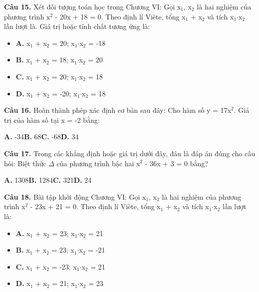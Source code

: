 \documentclass[11pt,a4paper]{article}
\begin{document}
\textbf{\color{primary} Câu 15.} Xét đối tượng toán học trong Chương VI: Gọi x$_1$, x$_2$ là hai nghiệm của phương trình x$^2$ - 20x + 18 = 0. Theo định lí Viète, tổng x$_1$ + x$_2$ và tích x$_1$$\cdot$x$_2$ lần lượt là. Giá trị hoặc tính chất tương ứng là:\par
\begin{itemize}\setlength{\itemsep}{1pt}\setlength{\parskip}{0pt}
  \item[] \textbf{A.} x$_1$ + x$_2$ = 20; x$_1$$\cdot$x$_2$ = -18
  \item[] \textbf{B.} x$_1$ + x$_2$ = 18; x$_1$$\cdot$x$_2$ = 20
  \item[] \textbf{C.} x$_1$ + x$_2$ = 20; x$_1$$\cdot$x$_2$ = 18
  \item[] \textbf{D.} x$_1$ + x$_2$ = -20; x$_1$$\cdot$x$_2$ = 18
\end{itemize}\vspace{2pt}
\textbf{\color{primary} Câu 16.} Hoàn thành phép xác định cơ bản sau đây: Cho hàm số y = 17x$^2$. Giá trị của hàm số tại x = -2 bằng:\par
\hspace*{1.5em}\textbf{A.} -34\quad\quad \textbf{B.} 68\quad\quad \textbf{C.} -68\quad\quad \textbf{D.} 34\par\vspace{2pt}
\textbf{\color{primary} Câu 17.} Trong các khẳng định hoặc giá trị dưới đây, đâu là đáp án đúng cho câu hỏi: Biệt thức $\Delta$ của phương trình bậc hai x$^2$ - 36x + 3 = 0 bằng?\par
\hspace*{1.5em}\textbf{A.} 1308\quad\quad \textbf{B.} 1284\quad\quad \textbf{C.} 321\quad\quad \textbf{D.} 24\par\vspace{2pt}
\textbf{\color{primary} Câu 18.} Bài tập khởi động Chương VI: Gọi x$_1$, x$_2$ là hai nghiệm của phương trình x$^2$ - 23x + 21 = 0. Theo định lí Viète, tổng x$_1$ + x$_2$ và tích x$_1$$\cdot$x$_2$ lần lượt là:\par
\begin{itemize}\setlength{\itemsep}{1pt}\setlength{\parskip}{0pt}
  \item[] \textbf{A.} x$_1$ + x$_2$ = 23; x$_1$$\cdot$x$_2$ = 21
  \item[] \textbf{B.} x$_1$ + x$_2$ = 23; x$_1$$\cdot$x$_2$ = -21
  \item[] \textbf{C.} x$_1$ + x$_2$ = -23; x$_1$$\cdot$x$_2$ = 21
  \item[] \textbf{D.} x$_1$ + x$_2$ = 21; x$_1$$\cdot$x$_2$ = 23
\end{itemize}\vspace{2pt}
\end{document}
